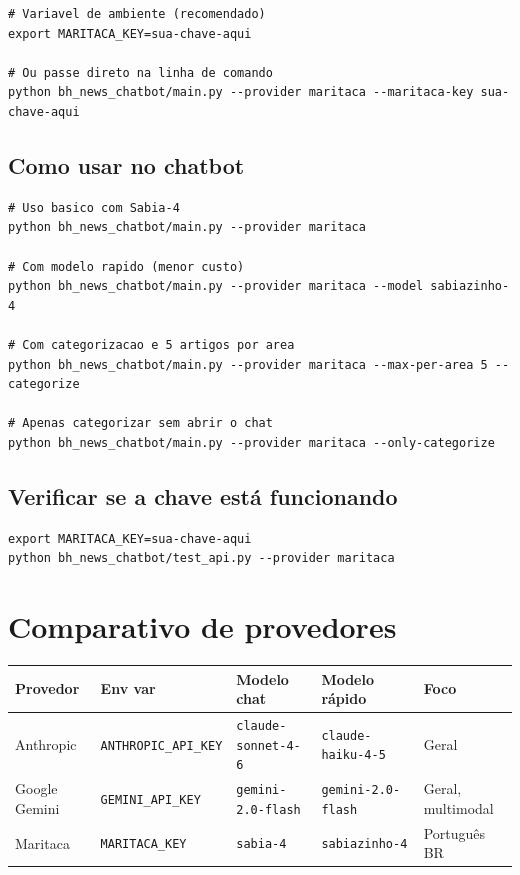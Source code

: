 \documentclass[12pt,a4paper]{article}
\begin{document}
\begin{lstlisting}
# Variavel de ambiente (recomendado)
export MARITACA_KEY=sua-chave-aqui

# Ou passe direto na linha de comando
python bh_news_chatbot/main.py --provider maritaca --maritaca-key sua-chave-aqui
\end{lstlisting}

\subsection{Como usar no chatbot}

\begin{lstlisting}
# Uso basico com Sabia-4
python bh_news_chatbot/main.py --provider maritaca

# Com modelo rapido (menor custo)
python bh_news_chatbot/main.py --provider maritaca --model sabiazinho-4

# Com categorizacao e 5 artigos por area
python bh_news_chatbot/main.py --provider maritaca --max-per-area 5 --categorize

# Apenas categorizar sem abrir o chat
python bh_news_chatbot/main.py --provider maritaca --only-categorize
\end{lstlisting}

\subsection{Verificar se a chave está funcionando}

\begin{lstlisting}
export MARITACA_KEY=sua-chave-aqui
python bh_news_chatbot/test_api.py --provider maritaca
\end{lstlisting}

\section{Comparativo de provedores}

\begin{tabularx}{\linewidth}{lllLL}
  \toprule
  \textbf{Provedor} & \textbf{Env var} & \textbf{Modelo chat} & \textbf{Modelo rápido} & \textbf{Foco} \\
  \midrule
  Anthropic & \texttt{ANTHROPIC\_API\_KEY} & \texttt{claude-sonnet-4-6} & \texttt{claude-haiku-4-5} & Geral \\
  Google Gemini & \texttt{GEMINI\_API\_KEY} & \texttt{gemini-2.0-flash} & \texttt{gemini-2.0-flash} & Geral, multimodal \\
  Maritaca & \texttt{MARITACA\_KEY} & \texttt{sabia-4} & \texttt{sabiazinho-4} & Português BR \\
  \bottomrule
\end{tabularx}
\end{document}
